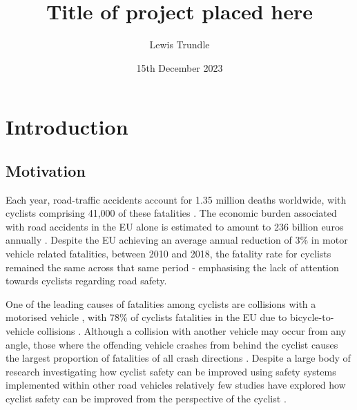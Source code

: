 \documentclass{interim}
\begin{document}
\title{Title of project placed here}
\author{Lewis Trundle}
\date{15th December 2023}
\maketitle

\tableofcontents
\newpage

\section{Introduction}\label{intro}
\subsection{Motivation}
Each year, road-traffic accidents account for 1.35 million deaths worldwide, with cyclists comprising 41,000 of these fatalities \cite{world2018global}. The economic burden associated with road accidents in the EU alone is estimated to amount to 236 billion euros annually \cite{costoftransport}. Despite the EU achieving an average annual reduction of 3\% in motor vehicle related fatalities, between 2010 and 2018, the fatality rate for cyclists remained the same across that same period \cite{adminaite2020safe} - emphasising the lack of attention towards cyclists regarding road safety.

One of the leading causes of fatalities among cyclists are collisions with a motorised vehicle \cite{BIL20101632}, with 78\% of cyclists fatalities in the EU due to bicycle-to-vehicle collisions \cite{adminaite2015making}. Although a collision with another vehicle may occur from any angle, those where the offending vehicle crashes from behind the cyclist causes the largest proportion of fatalities of all crash directions \cite{BIL20101632}. Despite a large body of research investigating how cyclist safety can be improved using safety systems implemented within other road vehicles \cite{scholliers2014potential, SILLA2017134, cieslik2019improving, 7929602, 10.1145/3434770.3459732} relatively few studies have explored how cyclist safety can be improved from the perspective of the cyclist \cite{10.1145/3490099.3511127, STROHAEKER2022151}. 
\end{document}
